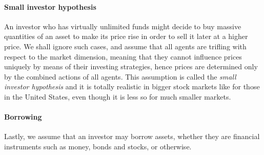 \paragraph{Small investor hypothesis}
An investor who has virtually unlimited funds might decide to buy massive quantities of an asset to make its price rise in order to sell it later at a higher price. We shall ignore such cases, and assume that all agents are trifling with respect to the market dimension, meaning that they cannot influence prices uniquely by means of their investing strategies, hence prices are determined only by the combined actions of all agents. This assumption is called the \emph{small investor hypothesis} and it is totally realistic in bigger stock markets like for those in the United States, even though it is less so for much smaller markets.


\paragraph{Borrowing}
Lastly, we assume that an investor may borrow assets, whether they are financial instruments such as money, bonds and stocks, or otherwise.


